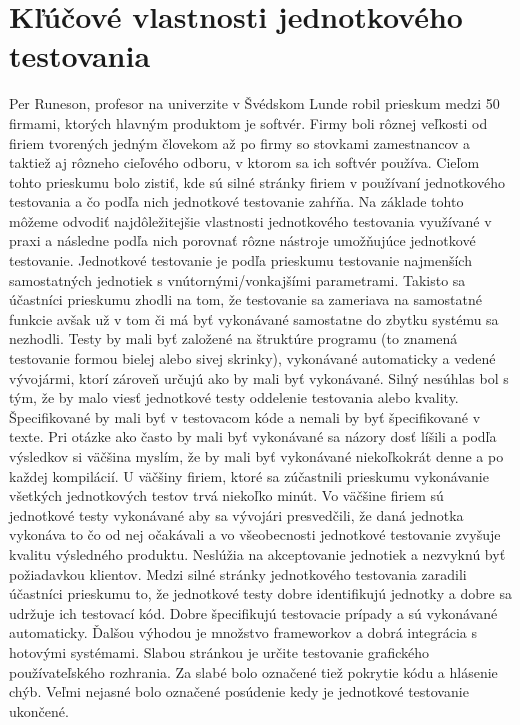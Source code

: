 \documentclass[11pt,twoside,slovak,a4paper]{article}
\begin{document}
	\section{Kľúčové vlastnosti jednotkového testovania}
	Per Runeson, profesor na univerzite v Švédskom Lunde robil prieskum medzi 50 firmami, ktorých hlavným produktom je softvér. Firmy boli rôznej veľkosti od firiem tvorených jedným človekom až po firmy so stovkami zamestnancov a taktiež aj rôzneho cieľového odboru, v ktorom sa ich softvér používa. Cieľom tohto prieskumu bolo zistiť, kde sú silné stránky firiem v používaní jednotkového testovania a čo podľa nich jednotkové testovanie zahŕňa. Na základe tohto môžeme odvodiť najdôležitejšie vlastnosti jednotkového testovania využívané v praxi a následne podľa nich porovnať rôzne nástroje umožňujúce jednotkové testovanie.\newline
	\newline
	Jednotkové testovanie je podľa prieskumu testovanie najmenších samostatných jednotiek s vnútornými/vonkajšími parametrami. Takisto sa účastníci prieskumu zhodli na tom, že testovanie sa zameriava na samostatné funkcie avšak už v tom či má byť vykonávané samostatne do zbytku systému sa nezhodli.\newline
	Testy by mali byť založené na štruktúre programu (to znamená testovanie formou bielej alebo sivej skrinky), vykonávané automaticky a vedené vývojármi, ktorí zároveň určujú ako by mali byť vykonávané. Silný nesúhlas bol s tým, že by malo viesť jednotkové testy oddelenie testovania alebo kvality. Špecifikované by mali byť v testovacom kóde a nemali by byť špecifikované v texte. \newline
	Pri otázke ako často by mali byť vykonávané sa názory dosť líšili a podľa výsledkov si väčšina myslím, že by mali byť vykonávané niekoľkokrát denne a po každej kompilácií.\newline
	U väčšiny firiem, ktoré sa zúčastnili prieskumu vykonávanie všetkých jednotkových testov trvá niekoľko minút.\newline
	Vo väčšine firiem sú jednotkové testy vykonávané aby sa vývojári presvedčili, že daná jednotka vykonáva to čo od nej očakávali a vo všeobecnosti jednotkové testovanie zvyšuje kvalitu výsledného produktu. Neslúžia na akceptovanie jednotiek a nezvyknú byť požiadavkou klientov.\newline
	\newline
	Medzi silné stránky jednotkového testovania zaradili účastníci prieskumu to, že jednotkové testy dobre identifikujú jednotky a dobre sa udržuje ich testovací kód. Dobre špecifikujú testovacie prípady a sú vykonávané automaticky. Ďalšou výhodou je množstvo frameworkov a dobrá integrácia s hotovými systémami.\newline
	Slabou stránkou je určite testovanie grafického používateľského rozhrania. Za slabé bolo označené tiež pokrytie kódu a hlásenie chýb. Veľmi nejasné bolo označené posúdenie kedy je jednotkové testovanie ukončené.
	
\end{document}
